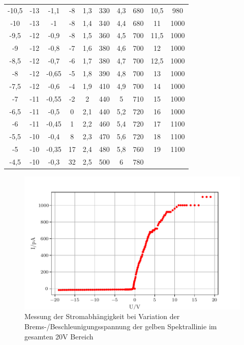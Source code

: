 \begin{table}[H]
\begin{tabular}{S[table-format=2.1] S[table-format=2] S[table-format=1.2] S[table-format=2]S[table-format=1.2]S[table-format=3]S[table-format=1.1]S[table-format=3]S[table-format=2.1]S[table-format=4]}
      -10,5 & -13 & -1,1 & -8 & 1,3 & 330 & 4,3 & 680 & 10,5 & 980 \\
      -10 & -13 & -1 & -8 & 1,4 & 340 & 4,4 & 680 & 11 & 1000 \\
      -9,5 & -12 & -0,9 & -8 & 1,5 & 360 & 4,5 & 700 & 11,5 & 1000 \\
      -9 & -12 & -0,8 & -7 & 1,6 & 380 & 4,6 & 700 & 12 & 1000 \\
      -8,5 & -12 & -0,7 & -6 & 1,7 & 380 & 4,7 & 700 & 12,5 & 1000 \\
      -8 & -12 & -0,65 & -5 & 1,8 & 390 & 4,8 & 700 & 13 & 1000 \\
      -7,5 & -12 & -0,6 & -4 & 1,9 & 410 & 4,9 & 700 & 14 & 1000 \\
      -7 & -11 & -0,55 & -2 & 2 & 440 & 5 & 710 & 15 & 1000 \\
      -6,5 & -11 & -0,5 & 0 & 2,1 & 440 & 5,2 & 720 & 16 & 1000 \\
      -6 & -11 & -0,45 & 1 & 2,2 & 460 & 5,4 & 720 & 17 & 1100 \\
      -5,5 & -10 & -0,4 & 8 & 2,3 & 470 & 5,6 & 720 & 18 & 1100 \\
      -5 & -10 & -0,35 & 17 & 2,4 & 480 & 5,8 & 760 & 19 & 1100 \\
      -4,5 & -10 & -0,3 & 32 & 2,5 & 500 & 6 & 780 &  &  \\
      \bottomrule
  \end{tabular}
\end{table}

\begin{figure}[H]
  \centering
  \includegraphics{content/Allgelb.pdf}
  \caption{Messung der Stromabhängigkeit bei Variation der Brems-/Beschleunigungsspannung der gelben Spektrallinie im gesamten 20V Bereich}
  \label{fig:rot}
\end{figure}
